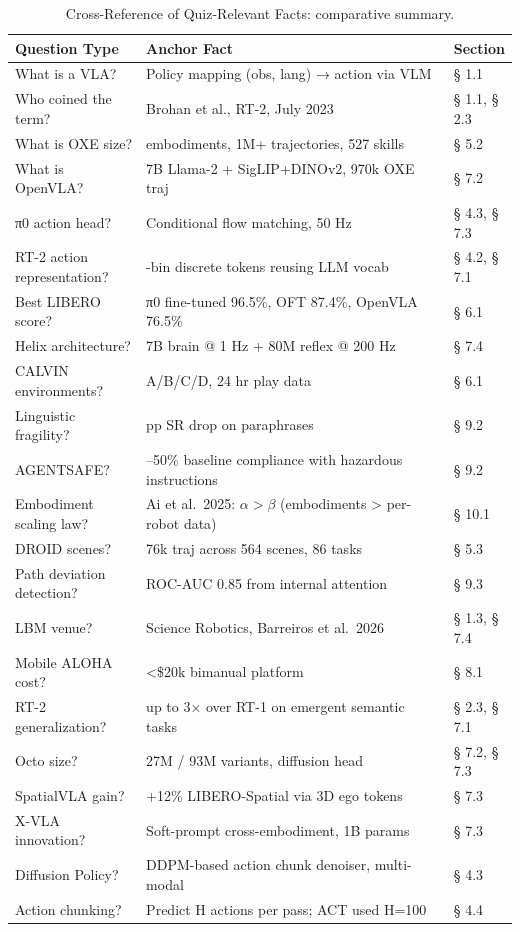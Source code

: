 \documentclass{article}
\begin{document}
\begin{table}[t]
\centering
\caption{Cross-Reference of Quiz-Relevant Facts: comparative summary.}
\label{tab:cross-reference-of-quiz-relevant-facts}
\begin{tabular}{>{\raggedright\arraybackslash}p{0.2647\linewidth}
  >{\raggedright\arraybackslash}p{0.6176\linewidth}
  >{\raggedright\arraybackslash}p{0.1176\linewidth}}
\toprule
Question Type & Anchor Fact & Section \\
\midrule
What is a VLA? & Policy mapping (obs, lang) → action via VLM & § 1.1 \\
Who coined the term? & Brohan et al., RT-2, July 2023 & § 1.1, § 2.3 \\
What is OXE size? & 22 embodiments, 1M+ trajectories, 527 skills & § 5.2 \\
What is OpenVLA? & 7B Llama-2 + SigLIP+DINOv2, 970k OXE traj & § 7.2 \\
π0 action head? & Conditional flow matching, 50 Hz & § 4.3, § 7.3 \\
RT-2 action representation? & 256-bin discrete tokens reusing LLM vocab & § 4.2, § 7.1 \\
Best LIBERO score? & π0 fine-tuned 96.5\%, OFT 87.4\%, OpenVLA 76.5\% & § 6.1 \\
Helix architecture? & 7B brain @ 1 Hz + 80M reflex @ 200 Hz & § 7.4 \\
CALVIN environments? & A/B/C/D, 24 hr play data & § 6.1 \\
Linguistic fragility? & 18 pp SR drop on paraphrases \citep{tong2026uncoveringlinguist} & § 9.2 \\
AGENTSAFE? & 30--50\% baseline compliance with hazardous instructions & § 9.2 \\
Embodiment scaling law? & Ai et al.~2025: \(\alpha > \beta\) (embodiments \textgreater{} per-robot data) & § 10.1 \\
DROID scenes? & 76k traj across 564 scenes, 86 tasks & § 5.3 \\
Path deviation detection? & ROC-AUC 0.85 from internal attention \citep{jeong2026yourvisionlanguage} & § 9.3 \\
LBM venue? & Science Robotics, Barreiros et al.~2026 & § 1.3, § 7.4 \\
Mobile ALOHA cost? & \textless\$20k bimanual platform & § 8.1 \\
RT-2 generalization? & up to 3× over RT-1 on emergent semantic tasks & § 2.3, § 7.1 \\
Octo size? & 27M / 93M variants, diffusion head & § 7.2, § 7.3 \\
SpatialVLA gain? & +12\% LIBERO-Spatial via 3D ego tokens & § 7.3 \\
X-VLA innovation? & Soft-prompt cross-embodiment, 1B params & § 7.3 \\
Diffusion Policy? & DDPM-based action chunk denoiser, multi-modal & § 4.3 \\
Action chunking? & Predict H actions per pass; ACT used H=100 & § 4.4 \\
\end{tabular}
\end{table}
\end{document}
